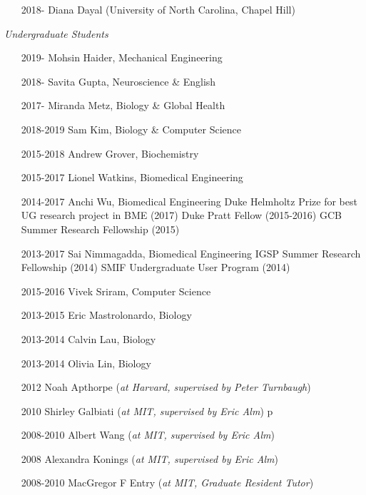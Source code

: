 \documentclass[overlapped,line,11pt]{res}
\begin{document}
\begin{resume}
\begin{itemize}[leftmargin=2cm, style=sameline, itemsep=0mm]
\item[2018-] Diana Dayal (University of North Carolina, Chapel Hill)
\end{itemize}

\vspace{-.1in}

\emph{Undergraduate Students}
\vspace{.1in}
\begin{itemize}[leftmargin=2cm, style=sameline, itemsep=0mm]

\item[2019-] Mohsin Haider, Mechanical Engineering
\item[2018-] Savita Gupta, Neuroscience \& English
\item[2017-] Miranda Metz, Biology \& Global Health 
\item[2018-2019] Sam Kim, Biology \& Computer Science
\item[2015-2018] Andrew Grover, Biochemistry 
\item[2015-2017] Lionel Watkins, Biomedical Engineering 
\item[2014-2017] Anchi Wu, Biomedical Engineering \newline 
  Duke Helmholtz Prize for best UG research project in BME (2017) \newline
  Duke Pratt Fellow (2015-2016) \newline
  GCB Summer Research Fellowship (2015) 
\item[2013-2017] Sai Nimmagadda, Biomedical Engineering \newline
  IGSP Summer Research Fellowship (2014) \newline
  SMIF Undergraduate User Program (2014)
\item[2015-2016] Vivek Sriram, Computer Science
\item[2013-2015] Eric Mastrolonardo, 
  Biology 
\item[2013-2014] Calvin Lau, Biology 
\item[2013-2014] Olivia Lin, Biology
\item[2012] Noah Apthorpe (\emph{at Harvard, supervised by Peter Turnbaugh})
\item[2010] Shirley Galbiati (\emph{at MIT, supervised by Eric Alm})
p\item[2008-2010] Albert Wang (\emph{at MIT, supervised by Eric Alm})
\item[2008] Alexandra Konings (\emph{at MIT, supervised by Eric Alm})
\item[2008-2010] MacGregor F Entry (\emph{at MIT, Graduate Resident Tutor})
\end{itemize}


\end{resume}
\end{document}
